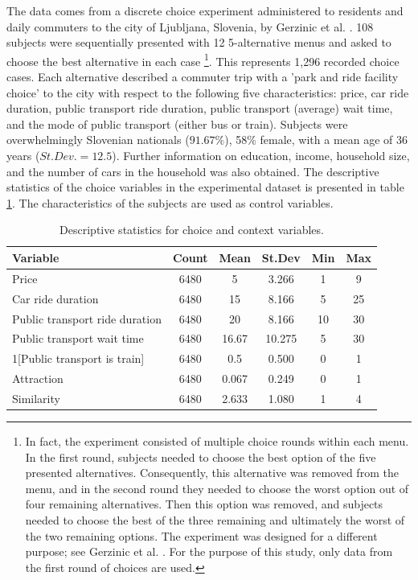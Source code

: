 \documentclass[a4paper,12pt]{article}
\newcommand{\citeyearonly}[1]{\citeyearpar{#1}}
\begin{document}
The data comes from a discrete choice experiment administered to residents and daily commuters to the city of Ljubljana, Slovenia, by Gerzinic et al. \citeyearonly{gerzinicEtAl21}. 108 subjects were sequentially presented with 12 5-alternative menus and asked to choose the best alternative in each case \footnote{In fact, the experiment consisted of multiple choice rounds within each menu. In the first round, subjects needed to choose the best option of the five presented alternatives. Consequently, this alternative was removed from the menu, and in the second round they needed to choose the worst option out of four remaining alternatives. Then this option was removed, and subjects needed to choose the best of the three remaining and ultimately the worst of the two remaining options. The experiment was designed for a different purpose; see Gerzinic et al. \citeyearonly{gerzinicEtAl21}. For the purpose of this study, only data from the first round of choices are used.}.  This represents 1,296 recorded choice cases. Each alternative described a commuter trip with a 'park and ride facility choice' to the city with respect to the following five characteristics: price, car ride duration, public transport ride duration, public transport (average) wait time, and the mode of public transport (either bus or train). Subjects were overwhelmingly Slovenian nationals ($91.67\%$), 58\% female, with a mean age of 36 years ($St. Dev.=12.5$). Further information on education, income, household size, and the number of cars in the household was also obtained. The descriptive statistics of the choice variables in the experimental dataset is presented in table \ref{tab:descriptivesNejc}. The characteristics of the subjects are used as control variables.

\begin{table}[ht]
    \centering
    \begin{tabular}{lccccc}
    \toprule
    Variable & Count & Mean & St.Dev & Min & Max \\
    \midrule
    Price & 6480 & 5 & 3.266 & 1 & 9 \\
    Car ride duration & 6480 & 15 & 8.166 & 5 & 25 \\
    Public transport ride duration & 6480 & 20 & 8.166 & 10 & 30 \\
    Public transport wait time & 6480 & 16.67 & 10.275 & 5 & 30 \\
    1[Public transport is train] & 6480 & 0.5 & 0.500 & 0 & 1 \\
    Attraction & 6480 & 0.067 & 0.249 & 0 & 1 \\
    Similarity & 6480 & 2.633 & 1.080 & 1 & 4 \\
    \bottomrule
    \end{tabular}
    \caption[Descriptive statistics of variables for transport experiment data]{Descriptive statistics for choice and context variables.}
    \label{tab:descriptivesNejc}
\end{table}
\end{document}
